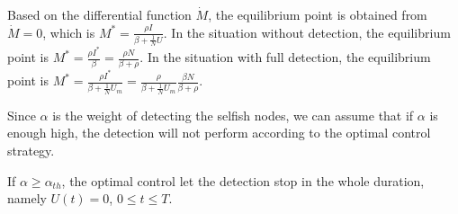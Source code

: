 Based on the differential function $\dot{M}$,
the equilibrium point is obtained from $\dot{M}=0$,
which is $M^{*}=\frac{\rho I}{\beta+\frac{1}{N}U}$.
In the situation without detection,
the equilibrium point is $M^{*}=\frac{\rho I^{*}}{\beta}=\frac{\rho N}{\beta + \rho}$.
In the situation with full detection,
the equilibrium point is $M^{*}=\frac{\rho I^{*}}{\beta + \frac{1}{N} U_{m}}=\frac{\rho}{\beta + \frac{1}{N} U_{m}} \frac{\beta N}{\beta+\rho}$.

Since $\alpha$ is the weight of detecting the selfish nodes,
we can assume that if $\alpha$ is enough high, the detection will not perform according to the optimal control strategy.
\begin{lem}
If $\alpha \ge \alpha_{th}$, the optimal control let the detection stop in the whole duration,
namely $U(t)=0$, $0 \le t \le T$.
\end{lem}

